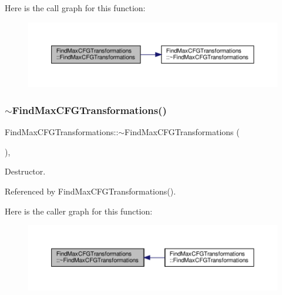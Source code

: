 Here is the call graph for this function\+:
\nopagebreak
\begin{figure}[H]
\begin{center}
\leavevmode
\includegraphics[width=350pt]{d7/d5e/classFindMaxCFGTransformations_a673dc6d1063056ac4fa2bfcd4764c25d_cgraph}
\end{center}
\end{figure}
\mbox{\label{classFindMaxCFGTransformations_a2134f75f8255b2961ccfb65179f59821}} 
\subsubsection{\texorpdfstring{$\sim$\+Find\+Max\+C\+F\+G\+Transformations()}{~FindMaxCFGTransformations()}}
{\footnotesize\ttfamily Find\+Max\+C\+F\+G\+Transformations\+::$\sim$\+Find\+Max\+C\+F\+G\+Transformations (\begin{DoxyParamCaption}{ }\end{DoxyParamCaption})\hspace{0.3cm}{\ttfamily [override]}, {\ttfamily [default]}}



Destructor. 



Referenced by Find\+Max\+C\+F\+G\+Transformations().

Here is the caller graph for this function\+:
\nopagebreak
\begin{figure}[H]
\begin{center}
\leavevmode
\includegraphics[width=350pt]{d7/d5e/classFindMaxCFGTransformations_a2134f75f8255b2961ccfb65179f59821_icgraph}
\end{center}
\end{figure}


